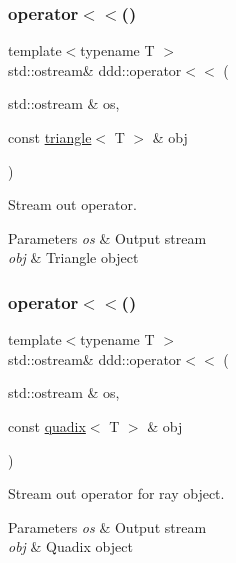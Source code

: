 \subsubsection{\texorpdfstring{operator$<$$<$()}{operator<<()}\hspace{0.1cm}{\footnotesize\ttfamily [6/10]}}
{\footnotesize\ttfamily template$<$typename T $>$ \\
std\+::ostream\& ddd\+::operator$<$$<$ (\begin{DoxyParamCaption}\item[{std\+::ostream \&}]{os,  }\item[{const \hyperlink{classddd_1_1triangle}{triangle}$<$ T $>$ \&}]{obj }\end{DoxyParamCaption})\hspace{0.3cm}{\ttfamily [inline]}}



Stream out operator. 


\begin{DoxyParams}{Parameters}
{\em os} & Output stream \\
\hline
{\em obj} & Triangle object \\
\hline
\end{DoxyParams}
\mbox{\label{namespaceddd_a58ae88cefdf3b919e400db6de59f4cfc}} 
\subsubsection{\texorpdfstring{operator$<$$<$()}{operator<<()}\hspace{0.1cm}{\footnotesize\ttfamily [7/10]}}
{\footnotesize\ttfamily template$<$typename T $>$ \\
std\+::ostream\& ddd\+::operator$<$$<$ (\begin{DoxyParamCaption}\item[{std\+::ostream \&}]{os,  }\item[{const \hyperlink{classddd_1_1quadix}{quadix}$<$ T $>$ \&}]{obj }\end{DoxyParamCaption})\hspace{0.3cm}{\ttfamily [inline]}}



Stream out operator for ray object. 


\begin{DoxyParams}{Parameters}
{\em os} & Output stream \\
\hline
{\em obj} & Quadix object \\
\hline
\end{DoxyParams}
\mbox{\label{namespaceddd_ae2604d6c72853dfb2595f6882cbc7a51}} 
